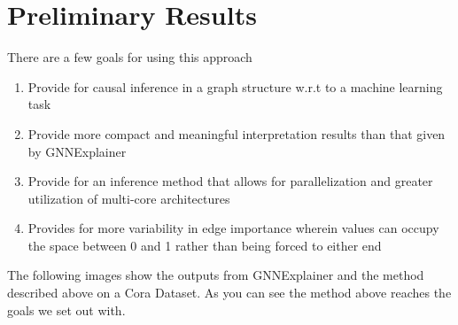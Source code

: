 \documentclass[11pt]{article}
\begin{document}
\section{Preliminary Results}
There are a few goals for using this approach
\begin{enumerate}
	\item Provide for causal inference in a graph structure w.r.t to a machine learning task
	\item Provide more compact and meaningful interpretation results than that given by GNNExplainer
	\item Provide for an inference method that allows for parallelization and greater utilization of multi-core architectures
	\item Provides for more variability in edge importance wherein values can occupy the space between 0 and 1 rather than being forced to either end  
\end{enumerate}
The following images show the outputs from GNNExplainer and the method described above on a Cora Dataset. As you can see the method above reaches the goals we set out with.
\end{document}
